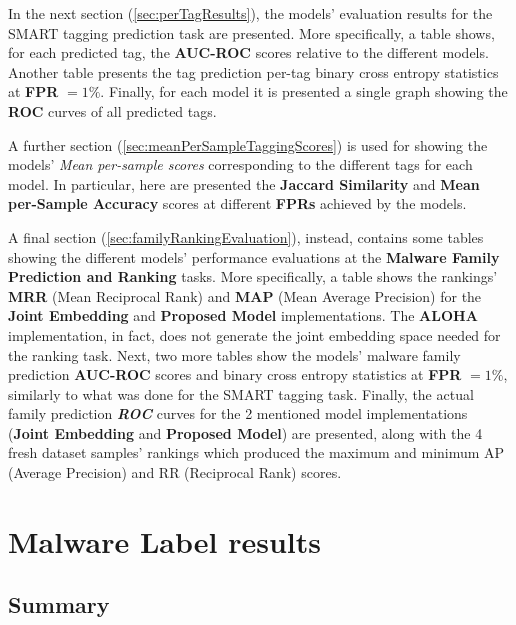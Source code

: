 \documentclass[pdfa%
,cucitura%
]{toptesi}
\begin{document}
In the next section (\ref{sec:perTagResults}), the models' evaluation results for the SMART tagging prediction task are presented. More specifically, a table shows, for each predicted tag, the \textbf{AUC-ROC} scores relative to the different models. Another table presents the tag prediction per-tag binary cross entropy statistics at \textbf{FPR} $=1\%$. Finally, for each model it is presented a single graph showing the \textbf{ROC} curves of all predicted tags.

A further section (\ref{sec:meanPerSampleTaggingScores}) is used for showing the models' \textit{Mean per-sample scores} corresponding to the different tags for each model. In particular, here are presented the \textbf{Jaccard Similarity} and \textbf{Mean per-Sample Accuracy} scores at different \textbf{FPRs} achieved by the models.

A final section (\ref{sec:familyRankingEvaluation}), instead, contains some tables showing the different models' performance evaluations at the \textbf{Malware Family Prediction and Ranking} tasks. More specifically, a table shows the rankings' \textbf{MRR} (Mean Reciprocal Rank) and \textbf{MAP} (Mean Average Precision) for the \textbf{Joint Embedding} and \textbf{Proposed Model} implementations. The \textbf{ALOHA} implementation, in fact, does not generate the joint embedding space needed for the ranking task. Next, two more tables show the models' malware family prediction \textbf{AUC-ROC} scores and binary cross entropy statistics at \textbf{FPR} $=1\%$, similarly to what was done for the SMART tagging task. Finally, the actual family prediction \textbf{\textit{ROC}} curves for the 2 mentioned model implementations (\textbf{Joint Embedding} and \textbf{Proposed Model}) are presented, along with the 4 fresh dataset samples' rankings which produced the maximum and minimum AP (Average Precision) and RR (Reciprocal Rank) scores.

\section{Malware Label results}\label{sec:malwareLabelResults}

\malwareResultsAucTable

\malwareResultsAtFprTable

\malwareRocAlohaMB

\malwareRocAloha

\malwareRocProposedMethod

\subsection{Summary}
\malwareResultsSummaryTable
\end{document}
